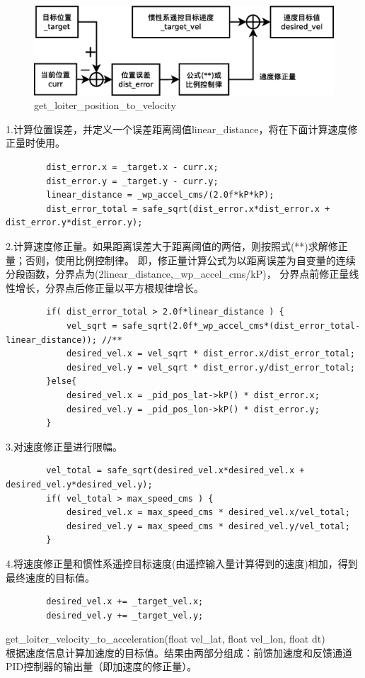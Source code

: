 \documentclass[a4paper,10pt]{ctexart} %
\begin{document}
\begin{figure}[!htb]\center
\includegraphics[scale=0.3]{get_loiter_position_to_velocity.eps}
\caption{get\_loiter\_position\_to\_velocity}\label{getloiterpositiontovelocity}
\end{figure}
1.计算位置误差，并定义一个误差距离阈值linear\_distance，将在下面计算速度修正量时使用。
\begin{lstlisting}
        dist_error.x = _target.x - curr.x;
        dist_error.y = _target.y - curr.y;
        linear_distance = _wp_accel_cms/(2.0f*kP*kP);
        dist_error_total = safe_sqrt(dist_error.x*dist_error.x + dist_error.y*dist_error.y);
\end{lstlisting}
2.计算速度修正量。如果距离误差大于距离阈值的两倍，则按照式(**)求解修正量；否则，使用比例控制律。
即，修正量计算公式为以距离误差为自变量的连续分段函数，分界点为(2linear\_distance,\_wp\_accel\_cms/kP)，
分界点前修正量线性增长，分界点后修正量以平方根规律增长。
\begin{lstlisting}
        if( dist_error_total > 2.0f*linear_distance ) {
            vel_sqrt = safe_sqrt(2.0f*_wp_accel_cms*(dist_error_total-linear_distance)); //**
            desired_vel.x = vel_sqrt * dist_error.x/dist_error_total;
            desired_vel.y = vel_sqrt * dist_error.y/dist_error_total;
        }else{
            desired_vel.x = _pid_pos_lat->kP() * dist_error.x;
            desired_vel.y = _pid_pos_lon->kP() * dist_error.y;
        }
\end{lstlisting}
3.对速度修正量进行限幅。
\begin{lstlisting}
        vel_total = safe_sqrt(desired_vel.x*desired_vel.x + desired_vel.y*desired_vel.y);
        if( vel_total > max_speed_cms ) {
            desired_vel.x = max_speed_cms * desired_vel.x/vel_total;
            desired_vel.y = max_speed_cms * desired_vel.y/vel_total;
        }
\end{lstlisting}
4.将速度修正量和惯性系遥控目标速度(由遥控输入量计算得到的速度)相加，得到最终速度的目标值。
\begin{lstlisting}
        desired_vel.x += _target_vel.x;	
        desired_vel.y += _target_vel.y;
\end{lstlisting}
\vspace{8pt}
\noindent get\_loiter\_velocity\_to\_acceleration(float vel\_lat, float vel\_lon, float dt)\\
根据速度信息计算加速度的目标值。结果由两部分组成：前馈加速度和反馈通道PID控制器的输出量（即加速度的修正量）。
\end{document}
